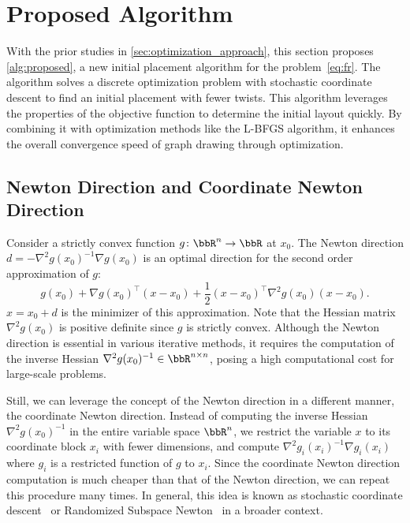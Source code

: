 \documentclass[11pt]{article}
\begin{document}
\section{Proposed Algorithm}
\label{sec:algorithm}

With the prior studies in \cref{sec:optimization_approach}, this section proposes \cref{alg:proposed}, a new initial placement algorithm for
the problem~\eqref{eq:fr}. The algorithm solves a discrete optimization problem with stochastic coordinate descent to find an initial placement with fewer twists.
This algorithm leverages the properties of the objective function to determine the initial layout quickly. By combining it with optimization methods like the L-BFGS algorithm, it enhances the overall convergence speed of graph drawing through optimization.

\subsection{Newton Direction and Coordinate Newton Direction}
\label{ssec:introNewton}

Consider a strictly convex function $g \colon \bbR^{n}\to \bbR$ at $x_{0}$.
The Newton direction $d = -\nabla^{2}g(x_{0})^{-1}\nabla g(x_{0})$ is an
optimal direction for the second order approximation of $g$:
\begin{equation*}
  g(x_{0}) + \nabla g(x_{0})^{\top}(x - x_{0}) + \frac{1}{2}(x - x_{0})^{\top}\nabla
  ^{2}g(x_{0}) (x - x_{0}).
\end{equation*}
$x = x_{0}+ d$ is the minimizer of this approximation. Note that the Hessian
matrix $\nabla^{2}g(x_{0})$ is positive definite since $g$ is strictly convex.
Although the Newton direction is essential in various iterative methods, it
requires the computation of the inverse Hessian
$\nabla^{2}g(x_{0})^{-1}\in \bbR^{n \times n}$, posing a high computational cost
for large-scale problems.

Still, we can leverage the concept of the Newton direction in a different
manner, the coordinate Newton direction. Instead of computing the inverse
Hessian $\nabla^{2}g(x_{0})^{-1}$ in the entire variable space $\bbR^{n}$, we restrict
the variable $x$ to its coordinate block $x_{i}$ with fewer dimensions, and
compute $\nabla^{2}g_{i}(x_{i})^{-1}\nabla g_{i}(x_{i})$ where $g_{i}$ is a
restricted function of $g$ to $x_{i}$. Since the coordinate Newton direction computation
is much cheaper than that of the Newton direction, we can repeat this
procedure many times. In general, this idea is known as stochastic coordinate
descent~\citep{recht-wright} or Randomized Subspace Newton~\citep{NEURIPS2019_bc6dc48b}
in a broader context.
\end{document}
